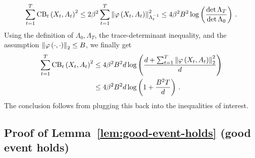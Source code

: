 %
\begin{equation*}
    \sum_{t=1}^T \operatorname{CB}_t \left( X_t, A_t \right)^2 \leq 2 \beta^2 \sum_{t=1}^T \left\|\varphi \left( X_t, A_t \right)\right\|_{\Lambda_t^{-1}}^2 \leq 4 \beta^2 B^2 \log \left( \frac{\det \Lambda_T}{\det \Lambda_0} \right)\,.
\end{equation*}
%
Using the definition of $\Lambda_0, \Lambda_T$, the trace-determinant inequality, and the assumption $\left\|\varphi \left( \cdot, \cdot \right)\right\|_2 \leq B$, we finally get
%
\begin{align*}
    \sum_{t=1}^T \operatorname{CB}_t \left( X_t, A_t \right)^2 &\leq 4 \beta^2 B^2 d \log \left( \frac{d + \sum_{t=1}^T \left\|\varphi \left( X_t, A_t \right)\right\|_2^2}{d} \right) \\
    &\leq 4 \beta^2 B^2 d \log \left( 1 + \frac{B^2 T}{d} \right)\,.
\end{align*}
%
The conclusion follows from plugging this back into the inequalities of interest.


\subsection{Proof of Lemma~\ref{lem:good-event-holds} (good event holds)}
\label{app:good-event-holds}

